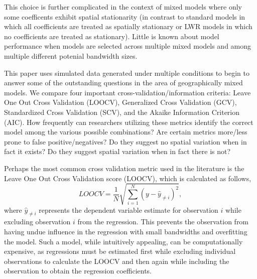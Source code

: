 \documentclass{article}\usepackage[]{graphicx}\usepackage[]{color}
\begin{document}
This choice is further complicated in the context of mixed models where only some coefficents exhibit spatial stationarity (in contrast to standard models in which all coefficients are treated as spatially stationary or LWR models in which no coefficients are treated as stationary). Little is known about model performance when models are selected across multiple mixed models and among multiple different potenial bandwidth sizes.

This paper uses simulated data generated under multiple conditions to begin to answer some of the outstanding questions in the area of geographically mixed models. We compare four important cross-validation/information criteria: Leave One Out Cross Validation (LOOCV), Generalized Cross Validation (GCV), Standardized Cross Validation (SCV), and the Akaike Information Criterion (AIC). How frequently can researchers utilizing these metrics identify the correct model among the various possible combinations? Are certain metrics more/less prone to false positive/negatives? Do they suggest no spatial variation when in fact it exists? Do they suggest spatial variation when in fact there is not? 

Perhaps the most common cross validation metric used in the literature is the Leave One Out Cross Validation score (LOOCV), which is calculated as follows,
\begin{equation}\label{eq:LOOCV}
LOOCV = \frac{1}{N} \sqrt{\sum _{i = 1}^{N} (y - \hat{y}_{\neq i})^2},  
\end{equation}
where $\hat{y}_{\neq i}$ represents the dependent variable estimate for observation $i$ while excluding observation $i$ from the regression. This prevents the observation from having undue influence in the regression with small bandwidths and overfitting the model. Such a model, while intuitively appealing, can be computationally expensive, as regressions must be estimated first while excluding individual observations to calculate the LOOCV and then again while including the observation to obtain the regression coefficients.
\end{document}
